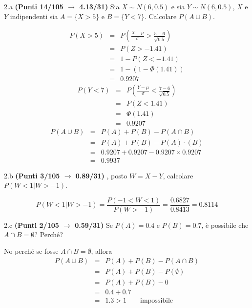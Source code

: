 \documentclass[
  11pt,
]{book}
\theoremstyle{mytheoremstyle}
\theoremstyle{mydefstyle}
\newenvironment{sol}
  {
  \begin{tcolorbox}[enhanced,breakable,arc=0.1mm,boxrule=1pt,colback=white,colframe=iblue,
  title=\bf \fontfamily{lmss}\selectfont \hspace{.5 cm} Soluzione,drop fuzzy shadow]

}{
\end{tcolorbox}
  }
\begin{document}
2.a \textbf{(Punti 14/105 \(\rightarrow\) 4.13/31)} Sia \(X\sim N(6,0.5)\) e sia \(Y\sim N(6,0.5)\), \(X\) e \(Y\) indipendenti sia \(A=\{X>5\}\) e \(B=\{Y<7\}\).
Calcolare \(P(A\cup B)\).

\begin{sol}
\begin{eqnarray*}
      P( X   >   5 ) 
        &=& P\left(  \frac { X  -  \mu }{ \sigma }  >  \frac { 5  -  6 }{\sqrt{ 0.5 }} \right)  \\
                 &=& P\left(  Z   >   -1.41 \right) \\    &=& 1-P(Z< -1.41 )\\ 
                 &=&  1-(1-\Phi( 1.41 )) \\ &=&  0.9207 
      \end{eqnarray*}\begin{eqnarray*}
      P( Y   <   7 ) 
        &=& P\left(  \frac { Y  -  \mu }{ \sigma }  <  \frac { 7  -  6 }{\sqrt{ 0.5 }} \right)  \\
                 &=& P\left(  Z   <   1.41 \right) \\    
                 &=&  \Phi( 1.41 ) \\ &=&  0.9207 
      \end{eqnarray*}\begin{eqnarray}
      P( A \cup B ) &=& P( A )+P( B )-P( A \cap B ) \\
                         &=& P( A )+P( B )-P( A )\cdot ( B ) \\
                         &=&  0.9207 + 0.9207 - 0.9207 \times 0.9207  \\
                         &=&  0.9937 \end{eqnarray}

\end{sol}

2.b \textbf{(Punti 3/105 \(\rightarrow\) 0.89/31)} , posto \(W=X-Y\), calcolare \(P(W<1|W>-1)\).

\begin{sol}
\[ 
P(W<1|W>-1)=\frac{P(-1<W<1)}{P(W>-1)}=\frac{0.6827}{0.8413}=0.8114
\]

\end{sol}

2.c \textbf{(Punti 2/105 \(\rightarrow\) 0.59/31)} Se \(P(A)=0.4\) e \(P(B)=0.7\), è possibile che \(A\cap B=\emptyset\)? Perché?

\begin{sol}
No perché se fosse \(A\cap B=\emptyset\), allora
\begin{eqnarray*}
P(A \cup B)    &=&  P(A) + P(B) - P(A\cap B)\\
               &=&  P(A) + P(B) - P(\emptyset)\\
               &=&  P(A) + P(B) - 0 \\
               &=&  0.4 + 0.7\\
               &=& 1.3 > 1 \qquad\text{impossibile}
\end{eqnarray*}

\end{sol}
\end{document}
